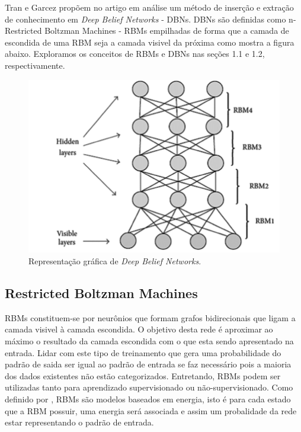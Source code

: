 \documentclass[a4paper, 12pt]{article}
\begin{document}
    Tran e Garcez\cite{Tran} propõem no artigo em análise um método de inserção e extração de conhecimento em \textit{Deep Belief Networks} - DBNs. DBNs são definidas como n-Restricted Boltzman Machines - RBMs empilhadas de forma que a camada de escondida de uma RBM seja a camada visivel da próxima como mostra a figura abaixo. Exploramos os conceitos de RBMs e DBNs nas seções 1.1 e 1.2, respectivamente.
    
    \begin{figure}[h]
     \centering
     \includegraphics[scale=0.3]{Graphical-Representation-of-a-Deep-Belief-Network.png}
     \caption{Representação gráfica de \textit{Deep Belief Networks}.\cite{imagem1}}
    \end{figure}
    
    \subsection{Restricted Boltzman Machines}
    RBMs constituem-se por neurônios que formam grafos bidirecionais que ligam a camada visivel à camada escondida. O objetivo desta rede é aproximar ao máximo o resultado da camada escondida com o que esta sendo apresentado na entrada. Lidar com este tipo de treinamento que gera uma probabilidade do padrão de saida ser igual ao padrão de entrada se faz necessário pois a maioria dos dados existentes não estão categorizados. Entretando, RBMs podem ser utilizadas tanto para aprendizado supervisionado ou não-supervisionado. Como definido por \cite{overviewRBM}, RBMs são modelos baseados em energia, isto é para cada estado que a RBM possuir, uma energia será associada e assim um probalidade da rede estar representando o padrão de entrada.
\end{document}
